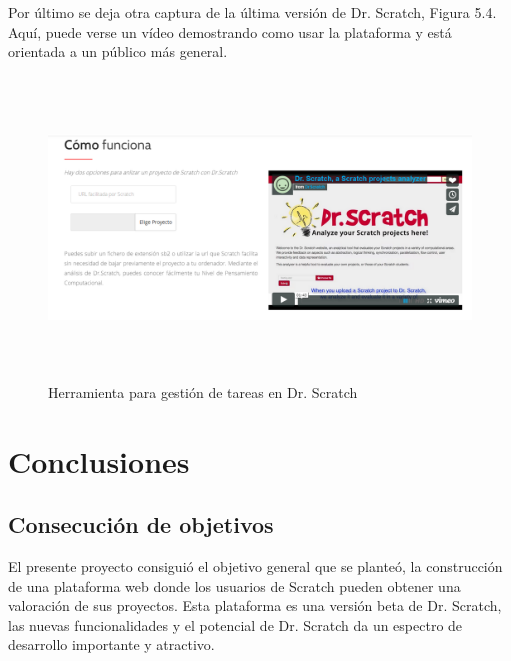 \documentclass[a4paper, 12pt]{book}
\begin{document}
Por último se deja otra captura de la última versión de Dr. Scratch, Figura 5.4. Aquí,
puede verse un vídeo demostrando como usar la plataforma y está orientada a un público 
más general.

\begin{figure}
	\centering
	\graphicspath{{img/}}
  \includegraphics[bb=0 0 800 600, width=18cm, height=8cm, keepaspectratio]{comofunciona.png}
	\caption{Herramienta para gestión de tareas en Dr. Scratch}
  \label{figura:foro_hilos}
\end{figure}





\cleardoublepage
\chapter{Conclusiones}
\label{chap:conclusiones}


\section{Consecución de objetivos}
\label{sec:consecucion-objetivos}

El presente proyecto consiguió el objetivo general que se planteó, la 
construcción de una plataforma web donde los usuarios de Scratch pueden 
obtener una valoración de sus proyectos. Esta plataforma es una versión
beta de Dr. Scratch, las nuevas funcionalidades y el potencial de Dr. 
Scratch da un espectro de desarrollo importante y atractivo. \\
\end{document}
